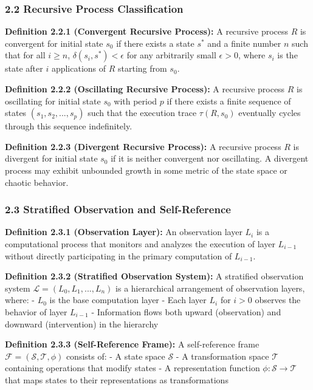 \documentclass[
]{article}
\begin{document}
\subsubsection{2.2 Recursive Process
Classification}\label{recursive-process-classification}

\textbf{Definition 2.2.1 (Convergent Recursive Process):} A recursive
process \(R\) is convergent for initial state \(s_0\) if there exists a
state \(s^*\) and a finite number \(n\) such that for all \(i \geq n\),
\(\delta(s_i, s^*) < \epsilon\) for any arbitrarily small
\(\epsilon > 0\), where \(s_i\) is the state after \(i\) applications of
\(R\) starting from \(s_0\).

\textbf{Definition 2.2.2 (Oscillating Recursive Process):} A recursive
process \(R\) is oscillating for initial state \(s_0\) with period \(p\)
if there exists a finite sequence of states \((s_1, s_2, ..., s_p)\)
such that the execution trace \(\tau(R, s_0)\) eventually cycles through
this sequence indefinitely.

\textbf{Definition 2.2.3 (Divergent Recursive Process):} A recursive
process \(R\) is divergent for initial state \(s_0\) if it is neither
convergent nor oscillating. A divergent process may exhibit unbounded
growth in some metric of the state space or chaotic behavior.

\subsubsection{2.3 Stratified Observation and
Self-Reference}\label{stratified-observation-and-self-reference}

\textbf{Definition 2.3.1 (Observation Layer):} An observation layer
\(L_i\) is a computational process that monitors and analyzes the
execution of layer \(L_{i-1}\) without directly participating in the
primary computation of \(L_{i-1}\).

\textbf{Definition 2.3.2 (Stratified Observation System):} A stratified
observation system \(\mathcal{L} = (L_0, L_1, ..., L_n)\) is a
hierarchical arrangement of observation layers, where: - \(L_0\) is the
base computation layer - Each layer \(L_i\) for \(i > 0\) observes the
behavior of layer \(L_{i-1}\) - Information flows both upward
(observation) and downward (intervention) in the hierarchy

\textbf{Definition 2.3.3 (Self-Reference Frame):} A self-reference frame
\(\mathcal{F} = (\mathcal{S}, \mathcal{T}, \phi)\) consists of: - A
state space \(\mathcal{S}\) - A transformation space \(\mathcal{T}\)
containing operations that modify states - A representation function
\(\phi: \mathcal{S} \rightarrow \mathcal{T}\) that maps states to their
representations as transformations
\end{document}
